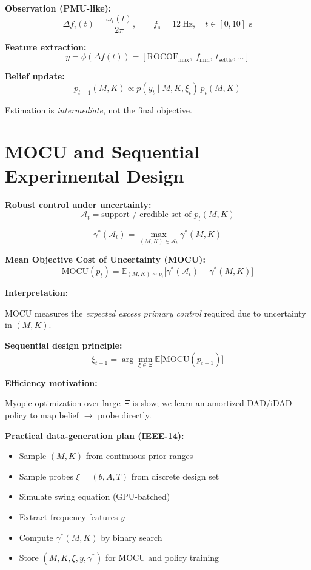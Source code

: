 \vspace{0.3em}
\textbf{Observation (PMU-like):}
\[
\Delta f_i(t)=\frac{\omega_i(t)}{2\pi},
\qquad f_s=12~\text{Hz},\quad t\in[0,10]\text{ s}
\]

\textbf{Feature extraction:}
\[
y = \phi(\Delta f(t))
=
[\text{ROCOF}_{\max},\ f_{\min},\ t_{\text{settle}},\dots]
\]

\vspace{0.3em}
\textbf{Belief update:}
\[
p_{t+1}(M,K)
\propto
p(y_t\mid M,K,\xi_t)\,p_t(M,K)
\]

Estimation is \emph{intermediate}, not the final objective.

\newpage
\section*{MOCU and Sequential Experimental Design}

\textbf{Robust control under uncertainty:}
\[
\mathcal{A}_t=\text{support / credible set of }p_t(M,K)
\]

\[
\gamma^*(\mathcal{A}_t)
=
\max_{(M,K)\in\mathcal{A}_t}\gamma^*(M,K)
\]

\vspace{0.3em}
\textbf{Mean Objective Cost of Uncertainty (MOCU):}
\[
\mathrm{MOCU}(p_t)
=
\mathbb{E}_{(M,K)\sim p_t}
\Big[
\gamma^*(\mathcal{A}_t)
-
\gamma^*(M,K)
\Big]
\]

\textbf{Interpretation:}

MOCU measures the \emph{expected excess primary control}
required due to uncertainty in $(M,K)$.

\vspace{0.4em}
\textbf{Sequential design principle:}
\[
\xi_{t+1}
=
\arg\min_{\xi\in\Xi}
\mathbb{E}\big[\mathrm{MOCU}(p_{t+1})\big]
\]

\textbf{Efficiency motivation:}

Myopic optimization over large $\Xi$ is slow;
we learn an amortized DAD/iDAD policy
to map belief $\rightarrow$ probe directly.

\vspace{0.4em}
\textbf{Practical data-generation plan (IEEE-14):}
\begin{itemize}
  \item Sample $(M,K)$ from continuous prior ranges
  \item Sample probes $\xi=(b,A,T)$ from discrete design set
  \item Simulate swing equation (GPU-batched)
  \item Extract frequency features $y$
  \item Compute $\gamma^*(M,K)$ by binary search
  \item Store $(M,K,\xi,y,\gamma^*)$ for MOCU and policy training
\end{itemize}